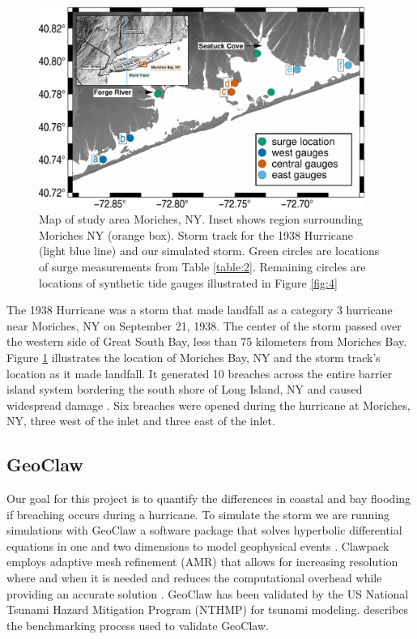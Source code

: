\documentclass{coastal_paper}
\begin{document}
\begin{figure}
    \centering
    \includegraphics[width=0.95\textwidth]{figures/fig2_v2.pdf}
    \caption{Map of study area Moriches, NY. Inset shows region surrounding Moriches NY (orange box). Storm track for the 1938 Hurricane (light blue line) and our simulated storm. Green circles are locations of surge measurements from Table \ref{table:2}. Remaining circles are locations of synthetic tide gauges illustrated in Figure \ref{fig:4}}
    \label{fig:1}
\end{figure}

The 1938 Hurricane was a storm that made landfall as a category 3 hurricane near Moriches, NY on September 21, 1938. The center of the storm passed over the western side of Great South Bay, less than 75 kilometers from Moriches Bay. Figure \ref{fig:1} illustrates the location of Moriches Bay, NY and the storm track's location as it made landfall. It generated 10 breaches across the entire barrier island system bordering the south shore of Long Island, NY and caused widespread damage \citep{morang1999shinnecock, coch1994hurricane, Canizares2008}. Six breaches were opened during the hurricane at Moriches, NY, three west of the inlet and three east of the inlet. 

\subsection{GeoClaw}
Our goal for this project is to quantify the differences in coastal and bay flooding if breaching occurs during a hurricane. To simulate the storm we are running simulations with GeoClaw a software package that solves hyperbolic differential equations in one and two dimensions to model geophysical events \citep{clawpack, mandli2016clawpack}. Clawpack employs adaptive mesh refinement (AMR) that allows for increasing resolution where and when it is needed and reduces the computational overhead while providing an accurate solution \citep{Berger2011TheRefinement}. GeoClaw has been validated by the US National Tsunami Hazard Mitigation Program (NTHMP) for tsunami modeling. \citep{gonzalez2011validation} describes the benchmarking process used to validate GeoClaw. 
\end{document}
